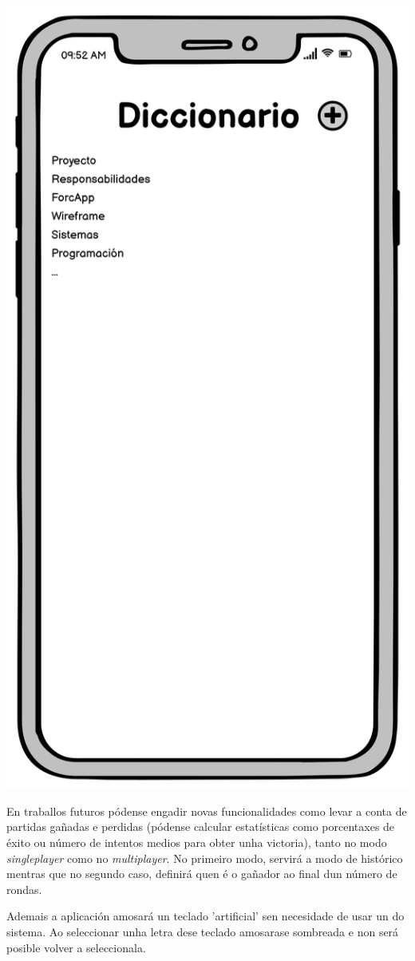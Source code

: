 \begin{center}
\includegraphics[scale=0.05]{imaxes/diccionario.png}\\ [30 pt]
\end{center}
En traballos futuros pódense engadir novas funcionalidades como levar a conta de partidas gañadas e perdidas (pódense calcular estatísticas como porcentaxes de éxito ou número de intentos medios para obter unha victoria), tanto no modo \textit{singleplayer} como no \textit{multiplayer}. No primeiro modo, servirá a modo de histórico mentras que no segundo caso, definirá quen é o gañador ao final dun número de rondas.

Ademais a aplicación amosará un teclado 'artificial' sen necesidade de usar un do sistema. Ao seleccionar unha letra dese teclado amosarase sombreada e non será posible volver a seleccionala.
 \let\cleardoublepage=\clearpage 